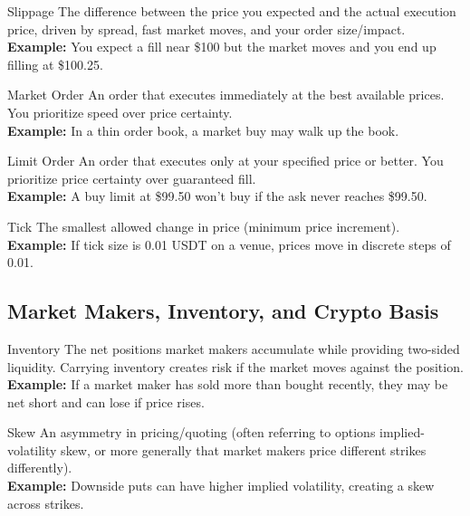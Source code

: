 \begin{keyterm}{Slippage}
The difference between the price you expected and the actual execution price, driven by
spread, fast market moves, and your order size/impact.
\\\textbf{Example:} You expect a fill near \$100 but the market moves and you end up filling at \$100.25.
\end{keyterm}

\begin{keyterm}{Market Order}
An order that executes immediately at the best available prices. You prioritize speed over
price certainty.
\\\textbf{Example:} In a thin order book, a market buy may walk up the book.
\end{keyterm}

\begin{keyterm}{Limit Order}
An order that executes only at your specified price or better. You prioritize price certainty over
guaranteed fill.
\\\textbf{Example:} A buy limit at \$99.50 won't buy if the ask never reaches \$99.50.
\end{keyterm}

\begin{keyterm}{Tick}
The smallest allowed change in price (minimum price increment).
\\\textbf{Example:} If tick size is 0.01 USDT on a venue, prices move in discrete steps of 0.01.
\end{keyterm}

\subsection{Market Makers, Inventory, and Crypto Basis}

\begin{keyterm}{Inventory}
The net positions market makers accumulate while providing two-sided liquidity.
Carrying inventory creates risk if the market moves against the position.
\\\textbf{Example:} If a market maker has sold more than bought recently, they may be net short and
can lose if price rises.
\end{keyterm}

\begin{keyterm}{Skew}
An asymmetry in pricing/quoting (often referring to options implied-volatility skew, or more generally
that market makers price different strikes differently).
\\\textbf{Example:} Downside puts can have higher implied volatility, creating a skew across strikes.
\end{keyterm}

